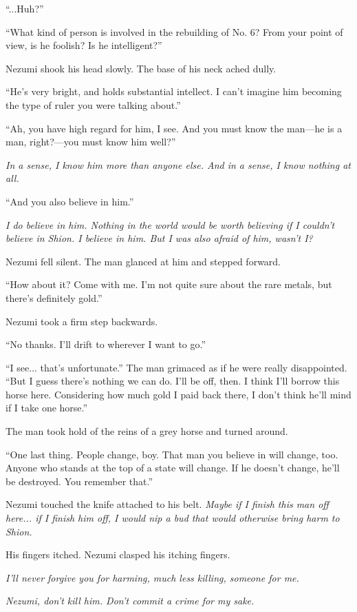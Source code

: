 ``...Huh?''

``What kind of person is involved in the rebuilding of No. 6? From your
point of view, is he foolish? Is he intelligent?''

Nezumi shook his head slowly. The base of his neck ached dully.

``He's very bright, and holds substantial intellect. I can't imagine him
becoming the type of ruler you were talking about.''

``Ah, you have high regard for him, I see. And you must know the man---he
is a man, right?---you must know him well?''

\emph{In a sense, I know him more than anyone else. And in a sense, I know
nothing at all.}

``And you also believe in him.''

\emph{I do believe in him. Nothing in the world would be worth believing if I
couldn't believe in Shion. I believe in him. But I was also afraid of
him, wasn't I?}

Nezumi fell silent. The man glanced at him and stepped forward.

``How about it? Come with me. I'm not quite sure about the rare metals,
but there's definitely gold.''

Nezumi took a firm step backwards.

``No thanks. I'll drift to wherever I want to go.''

``I see... that's unfortunate.'' The man grimaced as if he were really
disappointed. ``But I guess there's nothing we can do. I'll be off,
then. I think I'll borrow this horse here. Considering how much gold I
paid back there, I don't think he'll mind if I take one horse.''

The man took hold of the reins of a grey horse and turned around.

``One last thing. People change, boy. That man you believe in will
change, too. Anyone who stands at the top of a state will change. If he
doesn't change, he'll be destroyed. You remember that.''

Nezumi touched the knife attached to his belt. \emph{Maybe if I finish this
man off here... if I finish him off, I would nip a bud that would
otherwise bring harm to Shion.}

His fingers itched. Nezumi clasped his itching fingers.

\emph{I'll never forgive you for harming, much less killing, someone for me.}

\emph{Nezumi, don't kill him. Don't commit a crime for my sake.}

